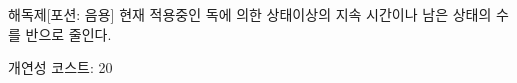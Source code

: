 \documentclass{report}
\begin{document}
	\begin{story}{해독제}{[포션: 음용]}
		현재 적용중인 독에 의한 상태이상의 지속 시간이나 남은 상태의 수를 반으로 줄인다.
		
		개연성 코스트: 20
	\end{story}
\end{document}
